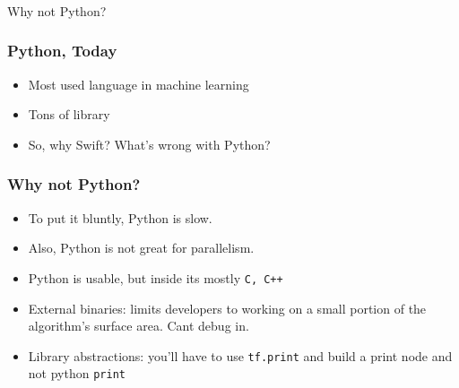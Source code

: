 \begin{frame}[fragile]\frametitle{}
\begin{center}
{\Large Why not Python?}
\end{center}
\end{frame}


\begin{frame}[fragile] \frametitle{Python, Today}

\begin{itemize}
\item Most used language in machine learning
\item Tons of library
\item So, why Swift? What’s wrong with Python?
\end{itemize}

\end{frame}

\begin{frame}[fragile] \frametitle{Why not Python?}

\begin{itemize}
\item To put it bluntly, Python is slow. 
\item Also, Python is not great for parallelism.
\item Python is usable, but inside its mostly \lstinline|C, C++|
\item External binaries:  limits developers to working on a small portion of the algorithm’s surface area. Cant debug in.
\item Library abstractions: you’ll have to use \lstinline|tf.print| and build a print node and not python \lstinline|print|
\end{itemize}

\end{frame}

